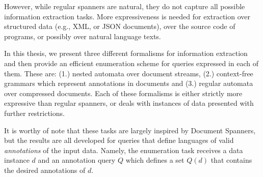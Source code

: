 However, while regular spanners are natural, they do not capture all
possible information extraction tasks. More
expressiveness is needed for extraction over structured data (e.g., XML,
or JSON documents), over the source code of programs, or possibly over
natural language texts. 

In this thesis, we present three different formalisms for information extraction and then provide an efficient enumeration scheme for queries expressed in each of them. 
These are: (1.) nested automata over document streams, (2.) context-free grammars which represent annotations in documents and (3.) regular automata over compressed documents. 
Each of these formalisms is either strictly more expressive than regular spanners, or deals with instances of data presented with further restrictions.

It is worthy of note that these tasks are largely inspired by Document Spanners, but the results are all developed for queries that define languages of valid {\it annotations} of the input data. Namely, the enumeration task receives a data instance $d$ and an annotation query $Q$ which defines a set $Q(d)$ that contains the desired annotations of $d$.


